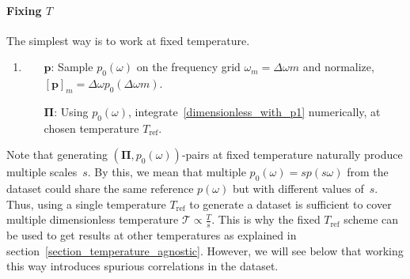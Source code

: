 \documentclass[notitlepage,11pt,nofootinbib]{revtex4-1}
\renewcommand{\vec}[1]{\bm{#1}}
\begin{document}
\paragraph*{Fixing $T$}
The simplest way is to work at fixed temperature.
\begin{enumerate}
    \item \label{fixT}
    \begin{itemize}
        \item[$\vec p$:] Sample $p_0(\omega)$ on the frequency grid $\omega_m=\Delta\omega m$ and normalize, $[\vec p]_m = \Delta\omega p_0(\Delta\omega m)$.
        \item[$\vec \Pi$:] Using $p_0(\omega)$, integrate~\eqref{dimensionless_with_p1} numerically, at chosen temperature $T_{\text{ref}}$.
    \end{itemize}
\end{enumerate}
Note that generating $(\vec\Pi, p_0(\omega))$-pairs at fixed temperature naturally produce multiple scales~$s$. By this, we mean that multiple $p_0(\omega)=sp(s\omega)$ from the dataset could share the same reference $p(\omega)$ but with different values of~$s$.
Thus, using a single temperature $T_{\text{ref}}$ to generate a dataset is sufficient to cover multiple dimensionless temperature $\mathcal T\propto\frac{T}{s}$. This is why the fixed $T_{\text{ref}}$ scheme can be used to get results at other temperatures as explained in section~\ref{section_temperature_agnostic}. However, we will see below that working this way introduces spurious correlations in the dataset.
\end{document}
